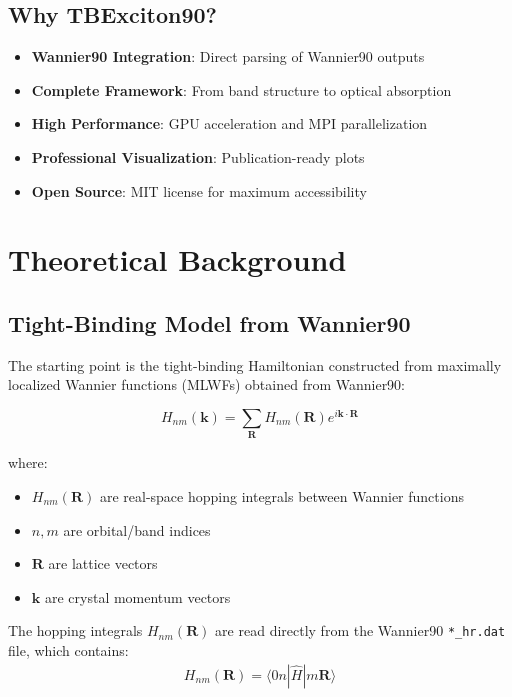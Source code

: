 \documentclass[11pt,a4paper]{article}
\newcommand{\code}[1]{\texttt{#1}}
\newcommand{\braket}[2]{\langle #1|#2\rangle}
\begin{document}
\subsection{Why TBExciton90?}

\begin{itemize}
    \item \textbf{Wannier90 Integration}: Direct parsing of Wannier90 outputs
    \item \textbf{Complete Framework}: From band structure to optical absorption
    \item \textbf{High Performance}: GPU acceleration and MPI parallelization
    \item \textbf{Professional Visualization}: Publication-ready plots
    \item \textbf{Open Source}: MIT license for maximum accessibility
\end{itemize}

\section{Theoretical Background}

\subsection{Tight-Binding Model from Wannier90}

The starting point is the tight-binding Hamiltonian constructed from maximally localized Wannier functions (MLWFs) obtained from Wannier90:

\begin{equation}
H_{nm}(\mathbf{k}) = \sum_{\mathbf{R}} H_{nm}(\mathbf{R}) e^{i\mathbf{k} \cdot \mathbf{R}}
\end{equation}

where:
\begin{itemize}
    \item $H_{nm}(\mathbf{R})$ are real-space hopping integrals between Wannier functions
    \item $n,m$ are orbital/band indices
    \item $\mathbf{R}$ are lattice vectors
    \item $\mathbf{k}$ are crystal momentum vectors
\end{itemize}

The hopping integrals $H_{nm}(\mathbf{R})$ are read directly from the Wannier90 \code{*\_hr.dat} file, which contains:
\begin{align}
H_{nm}(\mathbf{R}) = \braket{0n}{\hat{H}|m\mathbf{R}}
\end{align}
\end{document}
